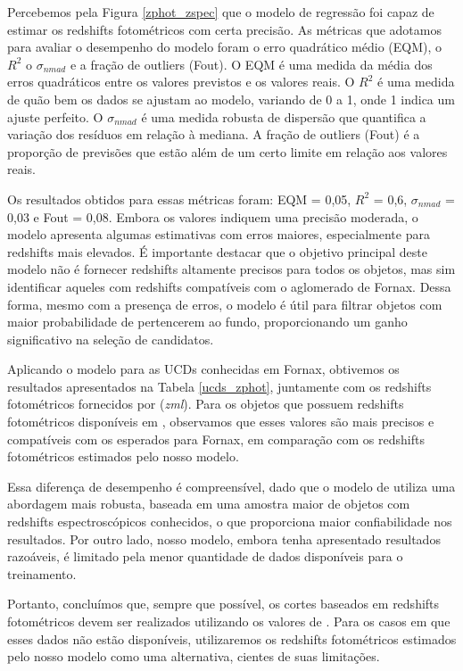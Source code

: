 Percebemos pela Figura \ref{zphot_zspec} que o modelo de regressão foi capaz de estimar os redshifts fotométricos com certa precisão. As métricas que adotamos para avaliar o desempenho do modelo foram o erro quadrático médio (EQM), o $R^2$ o $\sigma_{nmad}$ e a fração de outliers (Fout). O EQM é uma medida da média dos erros quadráticos entre os valores previstos e os valores reais. O $R^2$ é uma medida de quão bem os dados se ajustam ao modelo, variando de 0 a 1, onde 1 indica um ajuste perfeito. O $\sigma_{nmad}$ é uma medida robusta de dispersão que quantifica a variação dos resíduos em relação à mediana. A fração de outliers (Fout) é a proporção de previsões que estão além de um certo limite em relação aos valores reais.

Os resultados obtidos para essas métricas foram: EQM = 0,05, $R^2$ = 0,6, $\sigma_{nmad}$ = 0,03 e Fout = 0,08. Embora os valores indiquem uma precisão moderada, o modelo apresenta algumas estimativas com erros maiores, especialmente para redshifts mais elevados. É importante destacar que o objetivo principal deste modelo não é fornecer redshifts altamente precisos para todos os objetos, mas sim identificar aqueles com redshifts compatíveis com o aglomerado de Fornax. Dessa forma, mesmo com a presença de erros, o modelo é útil para filtrar objetos com maior probabilidade de pertencerem ao fundo, proporcionando um ganho significativo na seleção de candidatos.

Aplicando o modelo para as UCDs conhecidas em Fornax, obtivemos os resultados apresentados na Tabela \ref{ucds_zphot}, juntamente com os redshifts fotométricos fornecidos por \cite{erik_photoz_2024} (\textit{zml}). Para os objetos que possuem redshifts fotométricos disponíveis em \citep{erik_photoz_2024}, observamos que esses valores são mais precisos e compatíveis com os esperados para Fornax, em comparação com os redshifts fotométricos estimados pelo nosso modelo.

Essa diferença de desempenho é compreensível, dado que o modelo de \cite{erik_photoz_2024} utiliza uma abordagem mais robusta, baseada em uma amostra maior de objetos com redshifts espectroscópicos conhecidos, o que proporciona maior confiabilidade nos resultados. Por outro lado, nosso modelo, embora tenha apresentado resultados razoáveis, é limitado pela menor quantidade de dados disponíveis para o treinamento.

Portanto, concluímos que, sempre que possível, os cortes baseados em redshifts fotométricos devem ser realizados utilizando os valores de \cite{erik_photoz_2024}. Para os casos em que esses dados não estão disponíveis, utilizaremos os redshifts fotométricos estimados pelo nosso modelo como uma alternativa, cientes de suas limitações.

